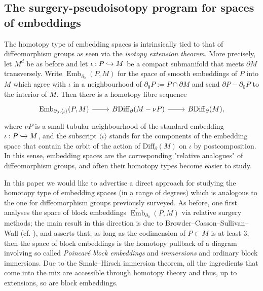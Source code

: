 \documentclass[a4paper, oneside]{amsart}
\newcommand{\diff}{\mathrm{Diff}}
\newcommand{\emb}{\operatorname{Emb}}
\newcommand{\bemb}{\widetilde{\operatorname{Emb}}}
\newcommand{\1}{\mathds{1}}
\theoremstyle{remark}
\theoremstyle{definition}
\numberwithin{equation}{section}
\begin{document}
\subsection{The surgery-pseudoisotopy program for spaces of embeddings}\label{SurgPseudosection}
The homotopy type of embedding spaces is intrinsically tied to that of diffeomorphism groups as seen via the \textit{isotopy extension theorem}. More precisely, let $M^d$ be as before and let $\iota: P\xhookrightarrow{} M$ be a compact submanifold that meets $\partial M$ transversely. Write $\emb_{\partial_0}(P,M)$ for the space of smooth embeddings of $P$ into $M$ which agree with $\iota$ in a neighbourhood of $\partial_0 P:= P\cap \partial M$ and send $\partial P- \partial_0 P$ to the interior of $M$. Then there is a homotopy fibre sequence
\begin{equation}\label{firstisotopyextensionseq}
\begin{tikzcd}
\emb_{\partial_0,\langle\iota\rangle}(P,M)\rar & B\diff_\partial(M-\nu P)\rar &B\diff_\partial(M),
\end{tikzcd}
\end{equation}
where $\nu P$ is a small tubular neighbourhood of the standard embedding $\iota: P\xhookrightarrow{}M$, and the subscript $\langle\iota\rangle$ stands for the components of the embedding space that contain the orbit of the action of $\diff_\partial(M)$ on $\iota$ by postcomposition. In this sense, embedding spaces are the corresponding "relative analogues" of diffeomorphism groups, and often their homotopy types become easier to study. 


In this paper we would like to advertise a direct approach for studying the homotopy type of embedding spaces (in a range of degrees) which is analogous to the one for diffeomorphism groups previously surveyed. As before, one first analyses the space of block embeddings $\bemb_{\partial_0}(P,M)$ via relative surgery methods; the main result in this direction is due to Browder--Casson--Sullivan--Wall (cf. \cite[Thm. 2.2.1]{GoodwillieKleinWeiss}), and asserts that, as long as the codimension of $P\subset M$ is at least $3$, then the space of block embeddings is the homotopy pullback of a diagram involving so called \textit{Poincaré block embeddings} and \emph{immersions} and ordinary block immersions. Due to the Smale--Hirsch immersion theorem, all the ingredients that come into the mix are accessible through homotopy theory and thus, up to extensions, so are block embeddings.
\end{document}
